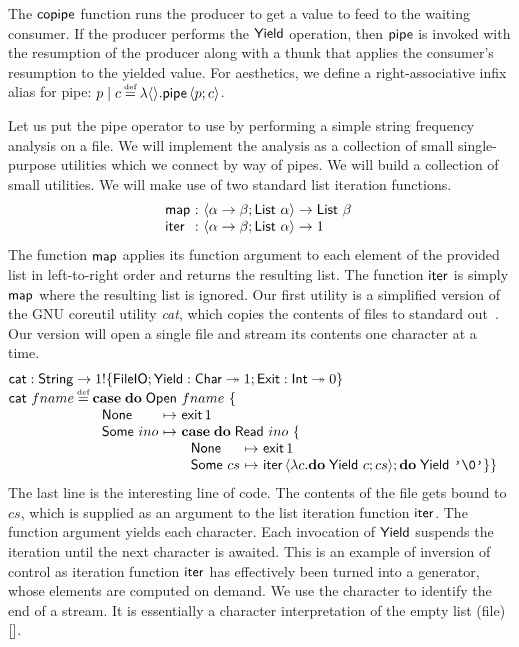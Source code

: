 \documentclass[12pt,phd,lfcs,twoside,openright,logo,leftchapter,normalheadings]{infthesis}
\theoremstyle{plain}
\theoremstyle{definition}
\begin{document}
The $\mathsf{copipe}$ function runs the producer to get a value to feed to the
waiting consumer.
If the producer performs the $\mathsf{Yield}$ operation, then $\mathsf{pipe}$ is
invoked with the resumption of the producer along with a thunk that
applies the consumer's resumption to the yielded value.
%
For aesthetics, we define a right-associative infix alias for pipe:
$p \mid c \defas \lambda\Unit.\Pipe\,\Record{p;c}$.

Let us put the pipe operator to use by performing a simple string
frequency analysis on a file. We will implement the analysis as a
collection of small single-purpose utilities which we connect by way
of pipes. We will build a collection of small utilities. We will make
use of two standard list iteration functions.
%
\[
  \ba{@{~}l@{~}c@{~}l}
    \map   &:& \Record{\alpha \to \beta;\List~\alpha} \to \List~\beta\\
    \iter  &:& \Record{\alpha \to \beta; \List~\alpha} \to \UnitType
  \ea
\]
%
The function $\mathsf{map}$ applies its function argument to each element of
the provided list in left-to-right order and returns the resulting
list. The function $\mathsf{iter}$ is simply $\mathsf{map}$ where the resulting list
is ignored. Our first utility is a simplified version of the GNU
coreutil utility \emph{cat}, which copies the contents of files to
standard out~\cite[Section~3.1]{MacKenzieMPPBYS20}. Our version will
open a single file and stream its contents one character at a time.
%
\[
  \bl
    \cat : \String \to \UnitType \eff \{\FileIO;\Yield : \Char \opto \UnitType;\Exit : \Int \opto \ZeroType\}\\
    \cat~fname \defas
      \bl
        \Case\;\Do\;\UOpen~fname~\{\\
        ~\ba[t]{@{~}l@{~}c@{~}l}
           \None &\mapsto& \exit\,1\\
           \Some~ino &\mapsto& \bl \Case\;\Do\;\URead~ino~\{\\
                                  ~\ba[t]{@{~}l@{~}c@{~}l}
                                     \None &\mapsto& \exit\,1\\
                                     \Some~cs &\mapsto& \iter\,\Record{\lambda c.\Do\;\Yield~c;cs}; \Do\;\Yield~\charlit{\textnil} \}\}
                                   \ea
                               \el
         \ea
      \el
  \el
\]
%
The last line is the interesting line of code. The contents of the
file gets bound to $cs$, which is supplied as an argument to the list
iteration function $\mathsf{iter}$. The function argument yields each
character. Each invocation of $\mathsf{Yield}$ suspends the iteration until
the next character is awaited.
%
This is an example of inversion of control as iteration function
$\mathsf{iter}$ has effectively been turned into a generator, whose elements
are computed on demand.
%
We use the character \textnil{} to identify the end of a stream. It is
essentially a character interpretation of the empty list (file)
$[]$.
\end{document}
